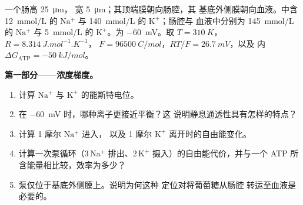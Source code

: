 \begin{problem}
\label{pb:b1:membranes-transport:1}
一个肠高 \qty{25}{\micro m}，
宽 \qty{5}{\micro m}；其顶端膜朝向肠腔，其
基底外侧膜朝向血液。中含 \qty{12}{mmol/L} 的
$\mathrm{Na^+}$ 与 \qty{140}{mmol/L} 的 $\mathrm{K^+}$；肠腔与
血液中分别为 \qty{145}{mmol/L} 的 $\mathrm{Na^+}$ 与 \qty{5}{mmol/L}
的 $\mathrm{K^+}$。为 \qty{-60}{mV}。取
$T = \qty{310}{K}$，$R = \qty{8.314}{J.mol^{-1}.K^{-1}}$，
$F = \qty{96500}{C/mol}$，$RT/F = \qty{26.7}{mV}$，以及
内 $\Delta G_{\text{ATP}} = \qty{-50}{kJ/mol}$。

\medskip
\noindent\textbf{第一部分——浓度梯度。}
\begin{enumerate}
  \item 计算 $\mathrm{Na^+}$ 与
        $\mathrm{K^+}$ 的能斯特电位。
  \item 在 \qty{-60}{mV} 时，哪种离子更接近平衡？这
        说明静息通透性具有怎样的特点？
  \item 计算 1 摩尔 $\mathrm{Na^+}$ 进入，
        以及 1 摩尔 $\mathrm{K^+}$ 离开时的自由能变化。
  \item 计算一次泵循环（$3\,\mathrm{Na^+}$
        排出、$2\,\mathrm{K^+}$ 摄入）的自由能代价，并与一个
        ATP 所含能量相比较，效率为多少？
  \item 泵仅位于基底外侧膜上。说明为何这种
        定位对将葡萄糖从肠腔
        转运至血液是必要的。
\end{enumerate}


\end{problem}
